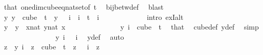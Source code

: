\begin{isabellebody}
\ that\ one{\isacharunderscore}{\kern0pt}dim{\isacharunderscore}{\kern0pt}cube{\isacharunderscore}{\kern0pt}eq{\isacharunderscore}{\kern0pt}nat{\isacharunderscore}{\kern0pt}set{\isacharbrackleft}{\kern0pt}of\ {\isachardoublequoteopen}t{\isachardoublequoteclose}{\isacharbrackright}{\kern0pt}\ \isamarkupfalse%
\ bij{\isacharunderscore}{\kern0pt}betw{\isacharunderscore}{\kern0pt}def\ \isamarkupfalse%
\ blast\isanewline
\ \ \ \ \ \ \ \ \ \ \isamarkupfalse%
\ \isamarkupfalse%
\ {\isachardoublequoteopen}{\isasymexists}{\isacharbang}{\kern0pt}y{\isachardot}{\kern0pt}\ y\ {\isasymin}\ cube\ {}\ t\ {\isasymand}\ y\ {}\ {\isacharequal}{\kern0pt}\ i{\isachardoublequoteclose}\ \ {\isachardoublequoteopen}i\ {\isacharless}{\kern0pt}\ t{\isachardoublequoteclose}\ \ i\ \isanewline
\ \ \ \ \ \ \ \ \ \ \isamarkupfalse%
\ {\isacharparenleft}{\kern0pt}intro\ ex{}I{\isacharunderscore}{\kern0pt}alt{\isacharparenright}{\kern0pt}\isanewline
\ \ \ \ \ \ \ \ \ \ \ \ \isamarkupfalse%
\ y\ \ {\isachardoublequoteopen}y\ {\isasymequiv}\ {\isacharparenleft}{\kern0pt}{\isasymlambda}x{\isacharcolon}{\kern0pt}{\isacharcolon}{\kern0pt}nat{\isachardot}{\kern0pt}\ {\isasymlambda}y{\isasymin}{\isacharbraceleft}{\kern0pt}{\isachardot}{\kern0pt}{\isachardot}{\kern0pt}{\isacharless}{\kern0pt}{}{\isacharcolon}{\kern0pt}{\isacharcolon}{\kern0pt}nat{\isacharbraceright}{\kern0pt}{\isachardot}{\kern0pt}\ x{\isacharparenright}{\kern0pt}{\isachardoublequoteclose}\ \isanewline
\ \ \ \ \ \ \ \ \ \ \ \ \isamarkupfalse%
\ {\isachardoublequoteopen}y\ i\ {\isasymin}\ {\isacharparenleft}{\kern0pt}cube\ {}\ t{\isacharparenright}{\kern0pt}{\isachardoublequoteclose}\ \isamarkupfalse%
\ that\ \isamarkupfalse%
\ cube{\isacharunderscore}{\kern0pt}def\ y{\isacharunderscore}{\kern0pt}def\ \isamarkupfalse%
\ simp\isanewline
\ \ \ \ \ \ \ \ \ \ \ \ \isamarkupfalse%
\ \isamarkupfalse%
\ {\isachardoublequoteopen}y\ i\ {}\ {\isacharequal}{\kern0pt}\ i{\isachardoublequoteclose}\ \isamarkupfalse%
\ y{\isacharunderscore}{\kern0pt}def\ \isamarkupfalse%
\ auto\isanewline
\ \ \ \ \ \ \ \ \ \ \ \ \isamarkupfalse%
\ \isamarkupfalse%
\ {\isachardoublequoteopen}z\ {\isacharequal}{\kern0pt}\ y\ i{\isachardoublequoteclose}\ \ {\isachardoublequoteopen}z\ {\isasymin}\ cube\ {}\ t{\isachardoublequoteclose}\ \ {\isachardoublequoteopen}z\ {}\ {\isacharequal}{\kern0pt}\ i{\isachardoublequoteclose}\ \ z\isanewline

\end{isabellebody}
